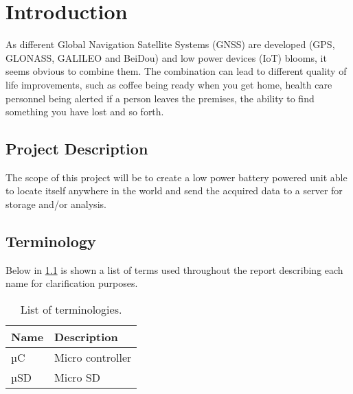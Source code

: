 
\chapter{Introduction}
\label{sec:introduction}
As different Global Navigation Satellite Systems (GNSS) are developed (GPS, GLONASS, GALILEO and BeiDou) and low power devices (IoT) blooms, it seems obvious to combine them.
The combination can lead to different quality of life improvements, such as coffee being ready when you get home, health care personnel being alerted if a person leaves the premises, the ability to find something you have lost and so forth.

\section{Project Description}
\label{sec:projectDescription}
The scope of this project will be to create a low power battery powered unit able to locate itself anywhere in the world and send the acquired data to a server for storage and/or analysis.

\section{Terminology}
\label{sec:terminology}
Below in \cref{tab:terminology} is shown a list of terms used throughout the report describing each name for clarification purposes.

\begin{table}[H]
	\centering
	\begin{tabular}{l l}
		\toprule
		\textbf{Name} & \textbf{Description} \\
		\midrule
		µC & Micro controller \\
		µSD & Micro SD \\
		\bottomrule
	\end{tabular}
	\caption{List of terminologies.}
	\label{tab:terminology}
\end{table}